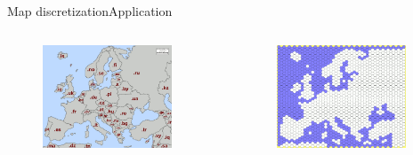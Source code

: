 \begin{frame}{Map discretization}{Application}
	\begin{columns}
		\begin{minipage}{\textwidth}
			\begin{figure}
				\centering
				\includegraphics[width = 0.9\textwidth]{./figure/map_tld_europe.jpg}
			\end{figure}
		\end{minipage}
		
		\begin{minipage}{\textwidth}
			\begin{figure}
				\centering
				\includegraphics[width = 0.9\textwidth]{./figure/hexagonal_europe_map.png}
			\end{figure}
		\end{minipage}	
	\end{columns}
\end{frame}

